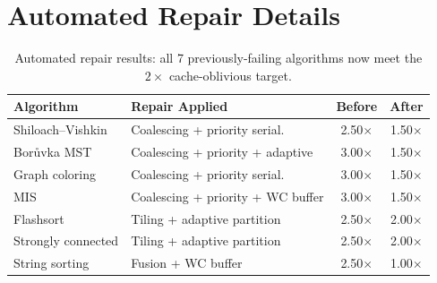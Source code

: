\documentclass[11pt]{article}
\begin{document}
\section{Automated Repair Details}
\label{app:repair}

\begin{table}[h]
\centering
\caption{Automated repair results: all 7 previously-failing algorithms
  now meet the $2\times$ cache-oblivious target.}
\label{tab:repair}
\begin{tabular}{@{}llcc@{}}
\toprule
\textbf{Algorithm} & \textbf{Repair Applied} & \textbf{Before} & \textbf{After} \\
\midrule
Shiloach--Vishkin & Coalescing + priority serial. & 2.50$\times$ & 1.50$\times$ \\
Bor\r{u}vka MST & Coalescing + priority + adaptive & 3.00$\times$ & 1.50$\times$ \\
Graph coloring & Coalescing + priority serial. & 3.00$\times$ & 1.50$\times$ \\
MIS & Coalescing + priority + WC buffer & 3.00$\times$ & 1.50$\times$ \\
Flashsort & Tiling + adaptive partition & 2.50$\times$ & 2.00$\times$ \\
Strongly connected & Tiling + adaptive partition & 2.50$\times$ & 2.00$\times$ \\
String sorting & Fusion + WC buffer & 2.50$\times$ & 1.00$\times$ \\
\bottomrule
\end{tabular}
\end{table}
\end{document}
